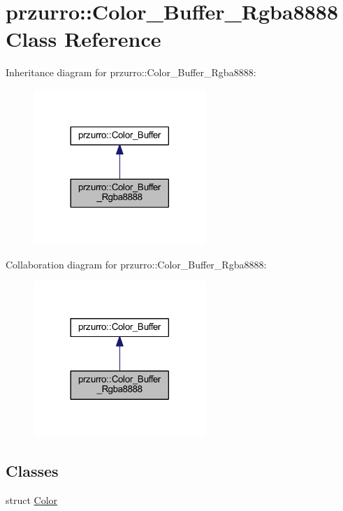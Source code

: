 \hypertarget{classprzurro_1_1_color___buffer___rgba8888}{}\section{przurro\+::Color\+\_\+\+Buffer\+\_\+\+Rgba8888 Class Reference}
\label{classprzurro_1_1_color___buffer___rgba8888}


Inheritance diagram for przurro\+::Color\+\_\+\+Buffer\+\_\+\+Rgba8888\+:
\nopagebreak
\begin{figure}[H]
\begin{center}
\leavevmode
\includegraphics[width=185pt]{d3/d79/classprzurro_1_1_color___buffer___rgba8888__inherit__graph}
\end{center}
\end{figure}


Collaboration diagram for przurro\+::Color\+\_\+\+Buffer\+\_\+\+Rgba8888\+:
\nopagebreak
\begin{figure}[H]
\begin{center}
\leavevmode
\includegraphics[width=185pt]{d9/de1/classprzurro_1_1_color___buffer___rgba8888__coll__graph}
\end{center}
\end{figure}
\subsection*{Classes}
\begin{DoxyCompactItemize}
\item 
struct \mbox{\hyperlink{structprzurro_1_1_color___buffer___rgba8888_1_1_color}{Color}}
\end{DoxyCompactItemize}
